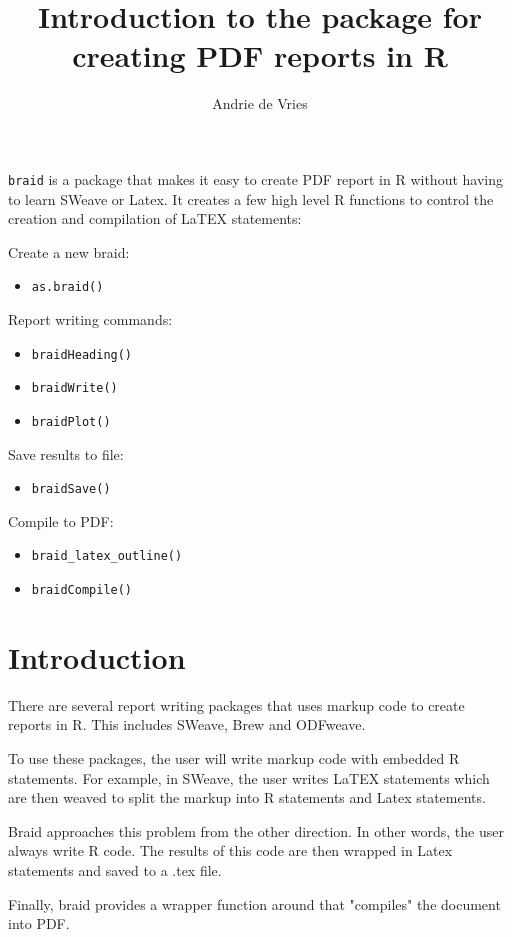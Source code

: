 \documentclass[a4paper]{article}
\title{Introduction to the \braid{} package for creating PDF reports in R}
\author{Andrie de Vries}
\newcommand{\braid}{{\tt braid}}
\newcommand{\code}[1]{{\tt #1}}
\begin{document}
\maketitle

\braid{} is a package that makes it easy to create PDF report in R without having to learn SWeave or Latex.  It creates a few high level R functions to control the creation and compilation of LaTEX statements:

Create a new braid: 
\begin{itemize}
	\item \code{as.braid()}
\end{itemize}

Report writing commands:
\begin{itemize}
	\item \code{braidHeading()}
	\item \code{braidWrite()}
	\item \code{braidPlot()}
\end{itemize}

Save results to file:
\begin{itemize}
	\item \code{braidSave()}
\end{itemize}

Compile to PDF:
\begin{itemize}
	\item \code{braid\_latex\_outline()}
	\item \code{braidCompile()}
\end{itemize}
	

\section{Introduction}

There are several report writing packages that uses markup code to create reports in R.  This includes SWeave, Brew and ODFweave.

To use these packages, the user will write markup code with embedded R statements.  For example, in SWeave, the user writes LaTEX statements which are then weaved to split the markup into R statements and Latex statements.

Braid approaches this problem from the other direction.  In other words, the user always write R code.  The results of this code are then wrapped in Latex statements and saved to a .tex file.

Finally, braid provides a wrapper function around \code{} that "compiles" the document into PDF.
\end{document}
